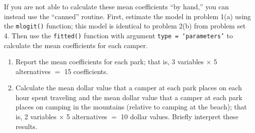 \documentclass[11pt,letterpaper]{article}
\begin{document}
\begin{enumerate}[label=\alph*., leftmargin=*]
	If you are not able to calculate these mean coefficients ``by hand,'' you can instead use the ``canned'' routine. First, estimate the model in problem 1(a) using the \texttt{mlogit()} function; this model is identical to problem 2(b) from problem set 4. Then use the \texttt{fitted()} function with argument \texttt{type = `parameters'} to calculate the mean coefficients for each camper.

	\begin{enumerate}[label=\roman*.]
		\item Report the mean coefficients for each park; that is, 3 variables $\times$ 5 alternatives $=$ 15 coefficients.

		\item Calculate the mean dollar value that a camper at each park places on each hour spent traveling and the mean dollar value that a camper at each park places on camping in the mountains (relative to camping at the beach); that is, 2 variables $\times$ 5 alternatives $=$ 10 dollar values. Briefly interpret these results.
	\end{enumerate}
\end{enumerate}
\end{document}
